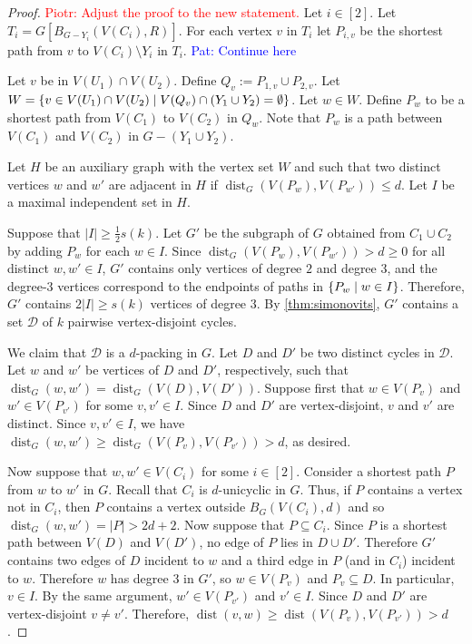 \documentclass{patmorin}
\newcommand{\pat}[1]{\textcolor{Blue}{Pat: #1}}
\newcommand{\piotr}[1]{\textcolor{red}{Piotr: #1}}
\DeclareMathOperator{\dist}{dist}
\DeclarePairedDelimiter\set{\{}{\}}
\begin{document}
\begin{proof}
\piotr{Adjust the proof to the new statement.}
    Let $i\in[2]$.
    Let $T_i = G[B_{G-Y_i}(V(C_i),R)]$.
    For each vertex $v$ in $T_i$ let $P_{i,v}$ be the shortest path from $v$ to $V(C_i)\setminus Y_i$ in $T_i$. \pat{Continue here}

    Let $v$ be in $V(U_1)\cap V(U_2)$.
    Define $Q_v:= P_{1,v}\cup P_{2,v}$.
    Let $W=\set{v \in V(U_1)\cap V(U_2) \mid V(Q_v)\cap (Y_1\cup Y_2) =\emptyset}$.
    Let $w \in W$.
    Define $P_w$ to be a shortest path from $V(C_1)$ to $V(C_2)$ in $Q_w$.
    Note that $P_w$ is a path between $V(C_1)$ and $V(C_2)$ in $G-(Y_1\cup Y_2)$.


    Let $H$ be an auxiliary graph with the vertex set $W$ and such that two distinct vertices $w$ and $w'$ are adjacent in $H$ if $\dist_G(V(P_w),V(P_{w'}))\leq d$.
    Let $I$ be a maximal independent set in $H$.

    Suppose that $|I|\geq \frac{1}{2}s(k)$.
    Let $G'$ be the subgraph of $G$ obtained from $C_1\cup C_2$ by adding $P_w$ for each $w\in I$.
    Since $\dist_G(V(P_w),V(P_{w'}))>d\ge0$ for all distinct $w,w'\in I$, $G'$ contains only vertices of degree $2$ and degree $3$, and the degree-$3$ vertices correspond to the endpoints of paths in $\set{P_w\mid w\in I}$.
    Therefore, $G'$ contains $2|I|\geq s(k)$ vertices of degree $3$.
    By \cref{thm:simonovits}, $G'$ contains a set $\mathcal{D}$ of $k$ pairwise vertex-disjoint cycles.

    We claim that $\mathcal{D}$ is a $d$-packing in $G$.
    Let $D$ and $D'$ be two distinct cycles in $\mathcal{D}$.
    Let $w$ and $w'$ be vertices of $D$ and $D'$, respectively,
    such that $\dist_G(w,w')=\dist_G(V(D),V(D'))$.
    Suppose first that $w\in V(P_v)$ and $w'\in V(P_{v'})$ for some  $v,v' \in I$.
    Since $D$ and $D'$ are vertex-disjoint, $v$ and $v'$ are distinct.
    Since $v,v'\in I$, we have $\dist_G(w,w') \geq \dist_G(V(P_v),V(P_{v'}))>d$, as desired.

    Now suppose that $w, w' \in V(C_i)$ for some $i\in[2]$.
    Consider a shortest path $P$ from $w$ to $w'$ in $G$.
    Recall that $C_i$ is $d$-unicyclic in $G$.
    Thus, if $P$ contains a vertex not in $C_i$, then $P$ contains a vertex outside $B_G(V(C_i),d)$ and so $\dist_G(w,w')=|P|>2d+2$.
    Now suppose that $P\subseteq C_i$.
    Since $P$ is a shortest path between $V(D)$ and $V(D')$, no edge of $P$ lies in $D\cup D'$.
    Therefore $G'$ contains two edges of $D$ incident to $w$ and a third edge in $P$ (and in $C_i$) incident to $w$.
    Therefore $w$ has degree $3$ in $G'$, so $w\in V(P_{v})$ and $P_v\subseteq D$.
    In particular, $v\in I$.
    By the same argument, $w'\in V(P_{v'})$ and $v'\in I$.
    Since $D$ and $D'$ are vertex-disjoint $v\neq v'$.
    Therefore, $\dist(v,w)\ge \dist(V(P_v),V(P_{v'}))>d$.



\end{proof}
\end{document}

